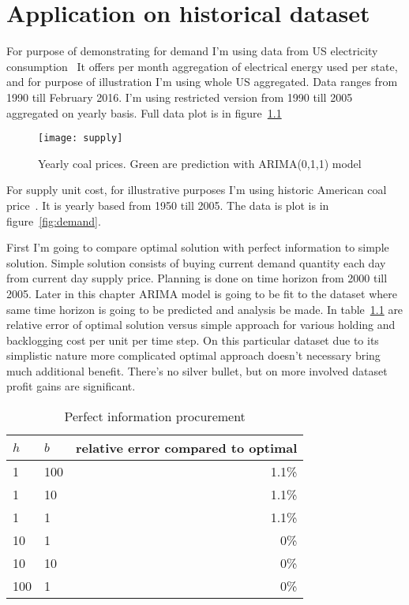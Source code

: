 
\chapter{Application on historical dataset}
\label{chap:Application on historical dataset}

For purpose of demonstrating for demand I'm using data from US electricity consumption~\autocite{us-elec} It offers per month aggregation of electrical energy used per state, and for purpose of illustration I'm using whole US aggregated. Data ranges from 1990 till February 2016. I'm using restricted version from 1990 till 2005 aggregated on yearly basis. Full data plot is in figure~\ref{fig:supply}

\begin{figure}[]
  \centering
  \texttt{[image: supply]}
  \caption{Yearly coal prices. Green are prediction with ARIMA(0,1,1) model}
  \label{fig:supply}
\end{figure}

For supply unit cost, for illustrative purposes I'm using historic American coal price~\autocite{us-coal}. It is yearly based from 1950 till 2005. The data is plot is in figure~\ref{fig:demand}.

First I'm going to compare optimal solution with perfect information to simple solution. Simple solution consists of buying current demand quantity each day from current day supply price. Planning is done on time horizon from 2000 till 2005. Later in this chapter ARIMA model is going to be fit to the dataset where same time horizon is going to be predicted and analysis be made. In table~\ref{my-label} are relative error of optimal solution versus simple approach for various holding and backlogging cost per unit per time step. On this particular dataset due to its simplistic nature more complicated optimal approach doesn't necessary bring much additional benefit. There's no silver bullet, but on more involved dataset profit gains are significant.

\begin{table}[]
\centering
\caption{Perfect information procurement}
\label{my-label}
\begin{tabular}{@{}llr@{}}
\toprule
$h$ & $b$ & relative error compared to optimal \\ \midrule
1   & 100 & 1.1\%          \\
1   & 10  & 1.1\%          \\
1   & 1   & 1.1\%          \\
10  & 1   & 0\%            \\
10  & 10  & 0\%            \\
100 & 1   & 0\%            \\ \bottomrule
\end{tabular}
\end{table}


